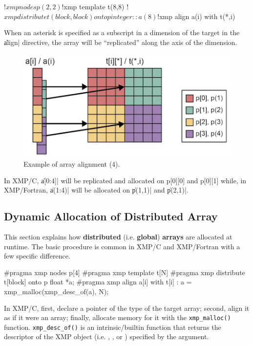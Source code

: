 \begin{XFexample}
!$xmp nodes p(2,2)
!$xmp template t(8,8)
!$xmp distribute t(block,block) onto p
integer :: a(8)
!$xmp align a(i) with t(*,i)
\end{XFexample}

When an asterisk is specified as a subscript in a dimension of the
target {\template} in the \|align| directive, the array will be
``replicated'' along the axis of the dimension.

\begin{figure}
  \centering
  \includegraphics{figs/replicate.png}
  \caption{Example of array alignment (4).}
\end{figure}

In XMP/C, \|a[0:4]| will be replicated and allocated on p[0][0] and
p[0][1] while, in XMP/Fortran, \|a(1:4)| will be allocated on \|p(1,1)|
and \|p(2,1)|.


\subsection{Dynamic Allocation of Distributed Array}

This section explains how {\bf distributed} (i.e. {\bf global}) {\bf
arrays} are allocated 
at runtime. The basic procedure is common in XMP/C and XMP/Fortran with
a few specific difference.


\begin{XCexample}
#pragma xmp nodes p[4]
#pragma xmp template t[N]
#pragma xmp distribute t[block] onto p
float *a;
#pragma xmp align a[i] with t[i]
  :
a = xmp_malloc(xmp_desc_of(a), N);
\end{XCexample}

In XMP/C, first, declare a pointer of the type of the target array; 
%
second, align it as if it were an array;
%
finally, allocate memory for it with the {\tt xmp\_malloc()}
function. {\tt xmp\_desc\_of()} is an 
intrinsic/builtin function that returns the descriptor of the XMP object
(i.e. {\nodes}, {\templates}, or {\garrays}) specified by the argument.

